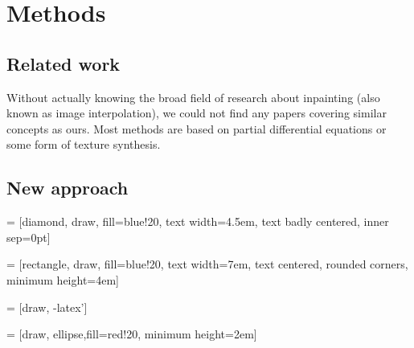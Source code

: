 \documentclass[10pt,conference,compsocconf]{IEEEtran}
\begin{document}
\section{Methods}
\subsection{Related work}
Without actually knowing the broad field of research about inpainting (also known as image interpolation), we could not find any papers covering similar concepts as ours. Most methods are based on partial differential equations or some form of texture synthesis.

\subsection{New approach}

 = [diamond, draw, fill=blue!20, 
    text width=4.5em, text badly centered, inner sep=0pt]

 = [rectangle, draw, fill=blue!20, 
    text width=7em, text centered, rounded corners, minimum height=4em]

 = [draw, -latex']

 = [draw, ellipse,fill=red!20,
    minimum height=2em]
    
\end{document}
